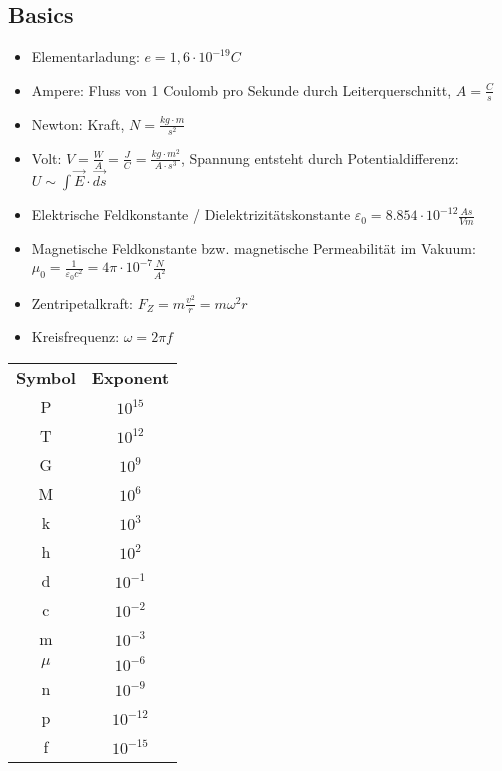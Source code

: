 \subsection*{Basics}
    \begin{itemize}
        \item Elementarladung: $e = 1,6 \cdot 10^{-19} C$
        \item Ampere: Fluss von 1 Coulomb pro Sekunde durch Leiterquerschnitt, $A = \frac{C}{s}$
        \item Newton: Kraft, $N = \frac{kg \cdot m}{s^2}$
        \item Volt: $V = \frac{W}{A} = \frac{J}{C} = \frac{kg \cdot m^2}{A \cdot s^3}$, Spannung entsteht durch Potentialdifferenz: $U \sim \int \overrightarrow{E} \cdot \overrightarrow{ds}$
        \item Elektrische Feldkonstante / Dielektrizitätskonstante $\varepsilon_0 = 8.854 \cdot 10^{-12} \frac{As}{Vm}$
        \item Magnetische Feldkonstante bzw. magnetische Permeabilität im Vakuum: $\mu_0 = \frac{1}{\varepsilon_0 c^2} = 4 \pi \cdot 10^{-7} \frac{N}{A^2}$
        \item Zentripetalkraft: $F_Z = m \frac{v^2}{r} = m \omega^2 r$
        \item Kreisfrequenz: $\omega = 2 \pi f$
    \end{itemize}
    
    \begin{tabular}{c c}
        \textbf{Symbol} & \textbf{Exponent}\\
        P & $10^{15}$ \\
        T & $10^{12}$ \\
        G & $10^9$ \\
        M & $10^6$ \\
        k & $10^3$ \\
        h & $10^2$ \\
        d & $10^{-1}$ \\
        c & $10^{-2}$ \\
        m & $10^{-3}$ \\
        $\mu$ & $10^{-6}$ \\
        n & $10^{-9}$ \\
        p & $10^{-12}$ \\
        f & $10^{-15}$ \\
    \end{tabular}